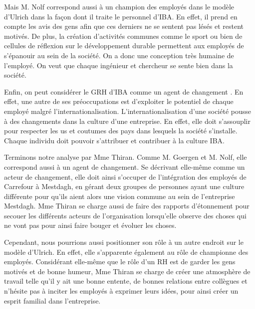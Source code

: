 Mais M. Nolf correspond aussi à un \og champion des employés \fg{} dans le modèle d'Ulrich dans la façon dont il traite le personnel d'IBA. En effet, il prend en compte les avis des gens afin que ces derniers ne se sentent pas lésés et restent motivés. De plus, la création d'activités communes comme le sport ou bien de cellules de réflexion sur le développement durable permettent aux employés de s'épanouir au sein de la société. On a donc une conception très humaine de l'employé. On veut que chaque ingénieur et chercheur se sente bien dans la société. \newline

Enfin, on peut considérer le GRH d'IBA comme un \og{} agent de changement \fg{}. En effet, une autre de ses préoccupations est d'exploiter le potentiel de chaque employé malgré l'internationalisation. L'internationalisation d'une société pousse à des changements dans la culture d'une entreprise. En effet, elle doit s'assouplir pour respecter les us et coutumes des pays dans lesquels la société s'installe. Chaque individu doit pouvoir s'attribuer et contribuer à la culture IBA. \newline

Terminons notre analyse par Mme Thiran. Comme M. Goergen et M. Nolf, elle correspond aussi à un agent de changement. Se décrivant elle-même comme un acteur de changement, elle doit ainsi s’occuper de l’intégration des employés de Carrefour à Mestdagh, en gérant deux groupes de personnes ayant une culture différente pour qu’ils aient alors une vision commune au sein de l'entreprise Mestdagh. Mme Thiran se charge aussi de faire des rapports d’étonnement pour secouer les différents acteurs de l’organisation lorsqu’elle observe des choses qui ne vont pas pour ainsi faire bouger et évoluer les choses.\newline

Cependant, nous pourrions aussi positionner son rôle à un autre endroit sur le modèle d’Ulrich. En effet, elle s’apparente également au rôle de championne des employés. Considérant elle-même que le rôle d’un RH est de garder les gens motivés et de bonne humeur, Mme Thiran se charge de créer une atmosphère de travail telle qu’il y ait une bonne entente, de bonnes relations entre collègues et n’hésite pas à inciter les employés à exprimer leurs idées, pour ainsi créer un esprit familial dans l’entreprise. 

